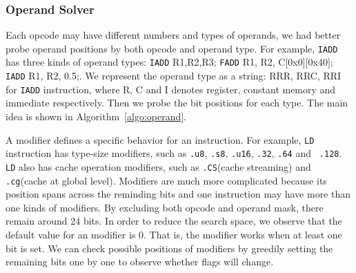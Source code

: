 \subsubsection{Operand Solver}
Each opcode may have different numbers and types of operands, we had better probe operand positions by both opcode and operand type. 
For example, {\tt IADD} has three kinds of operand types: {\tt IADD} R1,R2,R3; {\tt FADD} R1, R2,
C[0x0][0x40]; {\tt IADD} R1, R2, 0.5;. We represent the operand type as a string:
RRR, RRC, RRI for {\tt IADD} instruction, where R, C and I denotes register, constant
memory and immediate respectively. Then we probe the bit positions for each type.
The main idea is shown in Algorithm~\ref{algo:operand}.

A modifier defines a specific behavior for an instruction. For example,
{\tt LD} instruction has type-size modifiers, such as {\tt .u8}, {\tt .s8}, {\tt .u16}, {\tt .32}, {\tt .64} and {\tt 
.128}. {\tt LD} also has cache operation modifiers, such as {\tt .CS}(cache streaming) and {\tt .cg}(cache at global 
level). Modifiers are much more complicated because its position spans across the reminding bits and one instruction 
may have more than one kinds of modifiers. By excluding both opcode and operand mask, there remain around $24$ bits. In 
order to reduce the search space, we observe that the default value for an modifier is $0$. That is, the modifier works when at 
least one bit is set. We can check possible positions of modifiers by greedily setting the remaining bits one by one to 
observe whether flags will change.


